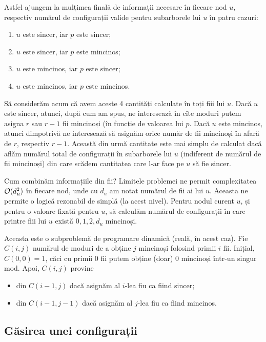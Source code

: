 \documentclass[../main.tex]{subfiles}
\begin{document}
Astfel ajungem la mulțimea finală de informații necesare în fiecare nod $u$, respectiv numărul de configurații valide pentru subarborele lui $u$ în patru cazuri:

\begin{enumerate}
  \item $u$ este sincer, iar $p$ este sincer;
  \item $u$ este sincer, iar $p$ este mincinos;
  \item $u$ este mincinos, iar $p$ este sincer;
  \item $u$ este mincinos, iar $p$ este mincinos.
\end{enumerate}

Să considerăm acum că avem aceste 4 cantități calculate în toți fiii lui $u$. Dacă $u$ este sincer, atunci, după cum am spus, ne interesează în cîte moduri putem asigna $r$ sau $r-1$ fii mincinoși (în funcție de valoarea lui $p$. Dacă $u$ este mincinos, atunci dimpotrivă ne interesează să asignăm orice număr de fii mincinoși în afară de $r$, respectiv $r-1$. Această din urmă cantitate este mai simplu de calculat dacă aflăm numărul total de configurații în subarborele lui $u$ (indiferent de numărul de fii mincinoși) din care scădem cantitatea care l-ar face pe $u$ să fie sincer.

Cum combinăm informațiile din fii? Limitele problemei ne permit complexitatea $\mathcal{O}(d_u^2)$ în fiecare nod, unde cu $d_u$ am notat numărul de fii ai lui $u$. Aceasta ne permite o logică rezonabil de simplă (la acest nivel). Pentru nodul curent $u$, și pentru o valoare fixată pentru $u$, să calculăm numărul de configurații în care printre fiii lui $u$ există $0, 1, 2, d_u$ mincinoși.

Aceasta este o subproblemă de programare dinamică (reală, în acest caz). Fie $C(i, j)$ numărul de moduri de a obține $j$ mincinoși folosind primii $i$ fii. Inițial, $C(0, 0) = 1$, căci cu primii 0 fii putem obține (doar) 0 mincinoși într-un singur mod. Apoi, $C(i, j)$ provine

\begin{itemize}
  \item din $C(i - 1, j)$ dacă asignăm al $i$-lea fiu ca fiind sincer;
  \item din $C(i - 1, j - 1)$ dacă asignăm al $j$-lea fiu ca fiind mincinos.
\end{itemize}

\subsection{Găsirea unei configurații}
\end{document}
